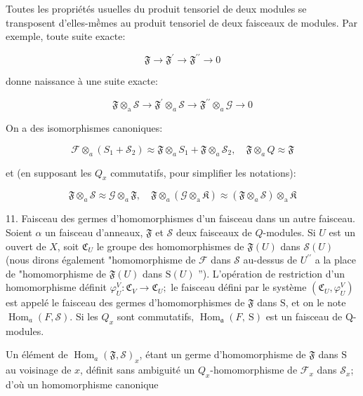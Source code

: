 Toutes les propriétés usuelles du produit tensoriel de deux modules se transposent d'elles-mềmes au produit tensoriel de deux faisceaux de modules. Par exemple, toute suite exacte:

$$
\mathfrak{F} \rightarrow \mathfrak{F}^{\prime} \rightarrow \mathfrak{F}^{\prime \prime} \rightarrow 0
$$

donne naissance à une suite exacte:

$$
\mathfrak{F} \otimes_{\mathrm{a}} \mathcal{S} \rightarrow \mathfrak{F}^{\prime} \otimes_{a} \mathcal{S} \rightarrow \mathfrak{F}^{\prime \prime} \otimes_{a} \mathcal{G} \rightarrow 0
$$

On a des isomorphismes canoniques:

$$
\mathscr{F} \otimes_{a}\left(S_{1}+\mathcal{S}_{2}\right) \approx \mathfrak{F} \otimes_{a} S_{1}+\mathfrak{F} \otimes_{a} \mathcal{S}_{2}, \quad \mathfrak{F} \otimes_{a} Q \approx \mathfrak{F}
$$

et (en supposant les $Q_{x}$ commutatifs, pour simplifier les notations):

$$
\mathfrak{F} \otimes_{a} \mathcal{S} \approx \mathcal{G} \otimes_{a} \mathfrak{F}, \quad \mathfrak{F} \otimes_{a}\left(\mathcal{G} \otimes_{\mathrm{a}} \mathfrak{K}\right) \approx\left(\mathfrak{F} \otimes_{a} \mathcal{S}\right) \otimes_{\mathrm{a}} \mathfrak{K}
$$

11. Faisceau des germes d'homomorphismes d'un faisceau dans un autre faisceau. Soient $\alpha$ un faisceau d'anneaux, $\mathfrak{F}$ et $\mathcal{S}$ deux faisceaux de $Q$-modules. Si $U$ est un ouvert de $X$, soit $\mathfrak{C}_{U}$ le groupe des homomorphismes de $\mathfrak{F}(U)$ dans $\mathcal{S}(U)$ (nous dirons également "homomorphisme de $\mathcal{F}$ dans $\mathcal{S}$ au-dessus de $U^{\prime \prime}$ a la place de "homomorphisme de $\mathfrak{F}(U)$ dans $\mathrm{S}(U)$ ''). L'opération de restriction d'un homomorphisme définit $\varphi_{U}^{V}: \mathfrak{C}_{V} \rightarrow \mathfrak{C}_{U} ;$ le faisceau défini par le système $\left(\mathfrak{C}_{U}, \varphi_{U}^{V}\right)$ est appelé le faisceau des germes d'homomorphismes de $\mathfrak{F}$ dans $\mathrm{S}$, et on le note $\operatorname{Hom}_{a}(F, \mathcal{S})$. Si les $Q_{x}$ sont commutatifs, $\operatorname{Hom}_{\mathfrak{a}}(F, \mathrm{~S})$ est un faisceau de Q-modules.

Un élément de $\operatorname{Hom}_{a}(\mathfrak{F}, \mathcal{S})_{x}$, étant un germe d'homomorphisme de $\mathfrak{F}$ dans $\mathrm{S}$ au voisinage de $x$, définit sans ambiguité un $Q_{x}$-homomorphisme de $\mathcal{F}_{x}$ dans $\mathcal{S}_{x}$; d'où un homomorphisme canonique

